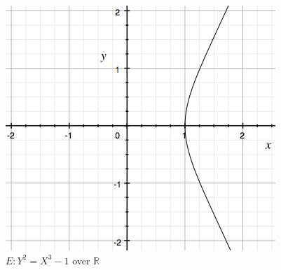 \documentclass[a4paper,12pt]{article}
\begin{document}
\begin{figure}[h!]
\begin{minipage}{0.45\textwidth}
\includegraphics[width=\textwidth]{fig-mar17-2}
\caption{$E: Y^2 = X^3 - 1$ over $\mathbb{R}$}
\end{minipage}
\end{figure}
\end{document}
